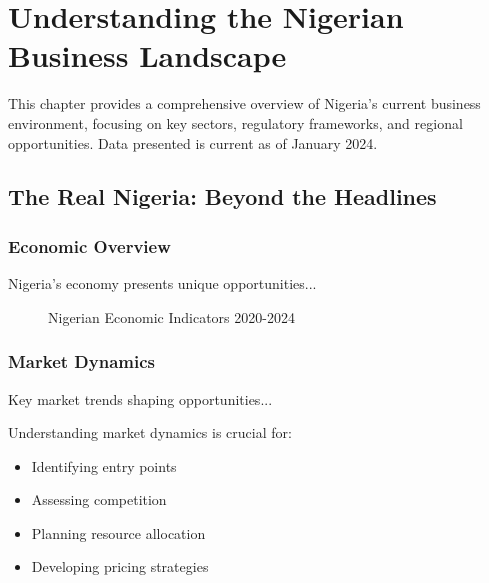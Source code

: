
\chapter{Understanding the Nigerian Business Landscape}

\begin{importantbox}
This chapter provides a comprehensive overview of Nigeria's current business environment, focusing on key sectors, regulatory frameworks, and regional opportunities. Data presented is current as of January 2024.
\end{importantbox}

\section{The Real Nigeria: Beyond the Headlines}

\subsection{Economic Overview}
Nigeria's economy presents unique opportunities...

\begin{figure}[h]
    \centering
    \caption{Nigerian Economic Indicators 2020-2024}
\end{figure}

\subsection{Market Dynamics}
Key market trends shaping opportunities...

\begin{importantbox}
Understanding market dynamics is crucial for:
\begin{itemize}
    \item Identifying entry points
    \item Assessing competition
    \item Planning resource allocation
    \item Developing pricing strategies
\end{itemize}
\end{importantbox}

